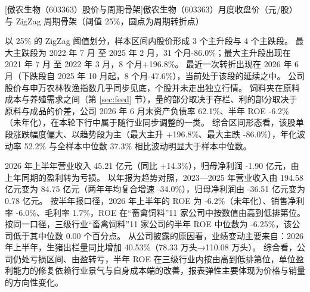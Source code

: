\begin{center}
\begin{minipage}{\textwidth}\centering
{}

[傲农生物（603363）股价与周期骨架]{傲农生物（603363）月度收盘价（元/股）与 ZigZag 周期骨架（阈值 25\%，圆点为周期转折点）}
\end{minipage}
\end{center}

 以 25\% 的 ZigZag 阈值划分，样本区间内股价形成 3 个主升段与 4 个主跌段。 最大主跌段为 2022 年 7 月 至 2025 年 2 月，31 个月-86.0\%；最大主升段出现在 2021 年 7 月 至 2022 年 3 月，8 个月+196.8\%。 最近一次转折出现在 2026 年 6 月（下跌段自 2025 年 10 月起，8 个月-47.6\%），当前处于该段的延续之中。 公司股价与申万农林牧渔指数几乎同步见底，个股并未走出独立行情。 饲料夹在原料成本与养殖需求之间（第 \ref{sec:feed} 节），量的部分取决于存栏、利的部分取决于原料与成品的价差，公司 2026 年 6 月末资产负债率 62.1\%、半年 ROE -6.2\%（未年化），在本轮下行中属于随行业同步调整的一类。 综合区间形态看，该股单段涨跌幅度偏大、以趋势段为主（最大主升 +196.8\%、最大主跌 -86.0\%），年化波动率 52.2\% 与全样本中位数 37.3\% 相比波动明显大于样本中位数。

 2026 年上半年营业收入 45.21 亿元（同比 +14.3\%），归母净利润 -1.90 亿元，由上年同期的盈利转为亏损。 以年报为趋势对照，2023---2025 年营业收入由 194.58 亿元变为 84.75 亿元（两年年均复合增速 -34.0\%），归母净利润由 -36.51 亿元变为 0.78 亿元。 按半年报口径，2026 年上半年的 ROE 为 -6.2\%（未年化）、销售净利率 -6.0\%、毛利率 1.7\%，ROE 在“畜禽饲料”11 家公司中按数值由高到低排第位。 按同一口径，三级行业“畜禽饲料”11 家公司的半年 ROE 中位数为 -6.25\%，该公司低于其中位数 0.00 个百分点。 从公司披露的原因看，业绩变动主要来自：2026 年上半年，生猪出栏量同比增加 40.53\%（78.33 万头→110.08 万头）。 综合看，公司仍处亏损区间、由盈转亏，半年 ROE 在三级行业内按由高到低排第位，单位盈利能力的修复依赖行业景气与自身成本端的改善，报表弹性主要体现为价格与销量的方向性变化。


